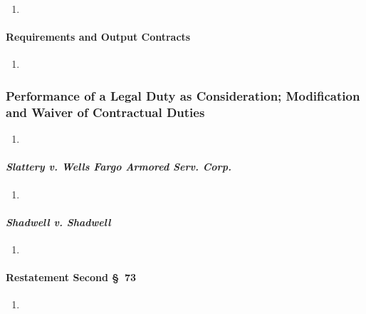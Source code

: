 \begin{enumerate}
    \item %
\end{enumerate}

\paragraph{Requirements and Output Contracts}

\begin{enumerate}
    \item %
\end{enumerate}

\subsubsection{Performance of a Legal Duty as Consideration; Modification and 
Waiver of Contractual Duties}

\begin{enumerate}
    \item %
\end{enumerate}

\paragraph{\emph{Slattery v. Wells Fargo Armored Serv. Corp.}}

\begin{enumerate}
    \item %
\end{enumerate}

\paragraph{\emph{Shadwell v. Shadwell}}

\begin{enumerate}
    \item %
\end{enumerate}

\paragraph{Restatement Second \S\ 73}

\begin{enumerate}
    \item %
\end{enumerate}


